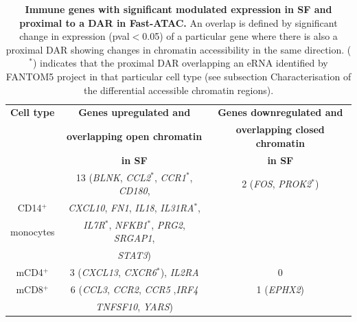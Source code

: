\begin{table}[htbp]
\centering
\begin{tabular}{@{} c c c}
\toprule
\textbf{Cell type} & \textbf{Genes upregulated and}        &  \textbf{Genes downregulated and} \\
                   & \textbf{overlapping open chromatin}   &  \textbf{overlapping closed chromatin} \\
									 &	\textbf{in SF}				               &  \textbf{in SF} \\
\midrule
\midrule
          & 13 (\textit{BLNK}, \textit{CCL2$^\ast$}, \textit{CCR1$^\ast$}, \textit{CD180}, & 2 (\textit{FOS}, \textit{PROK2$^\ast$}) \\      CD14$^+$  & \textit{CXCL10}, \textit{FN1}, \textit{IL18}, \textit{IL31RA$^\ast$},    & \\
monocytes & \textit{IL7R$^\ast$}, \textit{NFKB1$^\ast$}, \textit{PRG2}, \textit{SRGAP1}, & \\
				  & \textit{STAT3}) & \\
				
\midrule
mCD4$^+$ & 3 (\textit{CXCL13}, \textit{CXCR6$^\ast$}), \textit{IL2RA}& 0 \\

\midrule
mCD8$^+$ & 6 (\textit{CCL3}, \textit{CCR2}, \textit{CCR5} ,\textit{IRF4} & 1 (\textit{EPHX2}) \\
         & \textit{TNFSF10}, \textit{YARS}) & \\

\bottomrule
\end{tabular}
\medskip %
\caption[Immune genes with significant modulated expression in SF and proximal to a DAR in Fast-ATAC.]{\textbf{Immune genes with significant modulated expression in SF and proximal to a DAR in Fast-ATAC.} An overlap is defined by significant change in expression (pval$<$0.05) of a particular gene where there is also a proximal DAR showing changes in chromatin accessibility in the same direction. ($^\ast$) indicates that the proximal DAR overlapping an eRNA identified by FANTOM5 project in that particular cell type (see subsection Characterisation of the differential accessible chromatin regions).}
\label{tab:PSA_gene_expression_ATAC_overlap}
\end{table}

